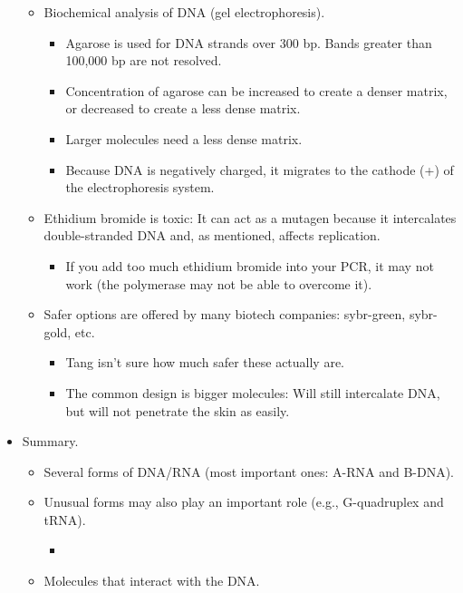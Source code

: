 \documentclass[../notes.tex]{subfiles}
\begin{document}
\begin{itemize}
    \begin{itemize}
        \item Biochemical analysis of DNA (gel electrophoresis).
        \begin{itemize}
            \item Agarose is used for DNA strands over 300 bp. Bands greater than 100,000 bp are not resolved.
            \item Concentration of agarose can be increased to create a denser matrix, or decreased to create a less dense matrix.
            \item Larger molecules need a less dense matrix.
            \item Because DNA is negatively charged, it migrates to the cathode (+) of the electrophoresis system.
        \end{itemize}
        \item Ethidium bromide is toxic: It can act as a mutagen because it intercalates double-stranded DNA and, as mentioned, affects replication.
        \begin{itemize}
            \item If you add too much ethidium bromide into your PCR, it may not work (the polymerase may not be able to overcome it).
        \end{itemize}
        \item Safer options are offered by many biotech companies: sybr-green, sybr-gold, etc.
        \begin{itemize}
            \item Tang isn't sure how much safer these actually are.
            \item The common design is bigger molecules: Will still intercalate DNA, but will not penetrate the skin as easily.
        \end{itemize}
    \end{itemize}
    \item Summary.
    \begin{itemize}
        \item Several forms of DNA/RNA (most important ones: A-RNA and B-DNA).
        \item Unusual forms may also play an important role (e.g., G-quadruplex and tRNA).
        \begin{itemize}
            \item 
        \end{itemize}
        \item Molecules that interact with the DNA.

\end{itemize}
\end{itemize}
\end{document}
